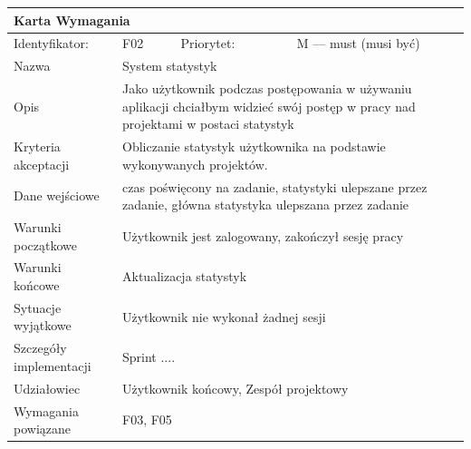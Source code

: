 \documentclass[a4paper,11pt]{report}
\begin{document}
		\begin{tabular}{|p{3cm}|p{2cm}|p{2cm}|p{6cm}|}
		\hline
		\multicolumn{4}{|p{12 cm}|}{Karta Wymagania}\\
		\hline
		Identyfikator: & F02 & Priorytet: & M — must (musi być)\\
		\hline
		Nazwa & \multicolumn{3}{|p{10 cm}|}{System statystyk}\\
		\hline
		Opis & \multicolumn{3}{|p{10 cm}|}{Jako użytkownik podczas postępowania w używaniu aplikacji chciałbym widzieć swój postęp w pracy nad projektami w postaci statystyk}\\
		\hline
		Kryteria akceptacji & \multicolumn{3}{|p{10 cm}|}{Obliczanie statystyk użytkownika na podstawie wykonywanych projektów.}\\
		\hline
		Dane wejściowe & \multicolumn{3}{|p{10 cm}|}{czas poświęcony na zadanie, statystyki ulepszane przez zadanie, główna statystyka ulepszana przez zadanie}\\
		\hline
		Warunki początkowe & \multicolumn{3}{|p{10 cm}|}{Użytkownik jest zalogowany, zakończył sesję pracy}\\
		\hline
		Warunki końcowe & \multicolumn{3}{|p{10 cm}|}{Aktualizacja statystyk}\\
		\hline
		Sytuacje wyjątkowe & \multicolumn{3}{|p{10 cm}|}{Użytkownik nie wykonał żadnej sesji}\\
		\hline
		Szczegóły implementacji & \multicolumn{3}{|p{10 cm}|}{Sprint ....}\\
		\hline
		Udziałowiec & \multicolumn{3}{|p{10 cm}|}{Użytkownik końcowy, Zespół projektowy}\\
		\hline
		Wymagania powiązane & \multicolumn{3}{|p{10 cm}|}{F03, F05}\\
		\hline
		\end{tabular}\\
		\newline
		\vspace*{0,2 cm}
		\newline
\end{document}
